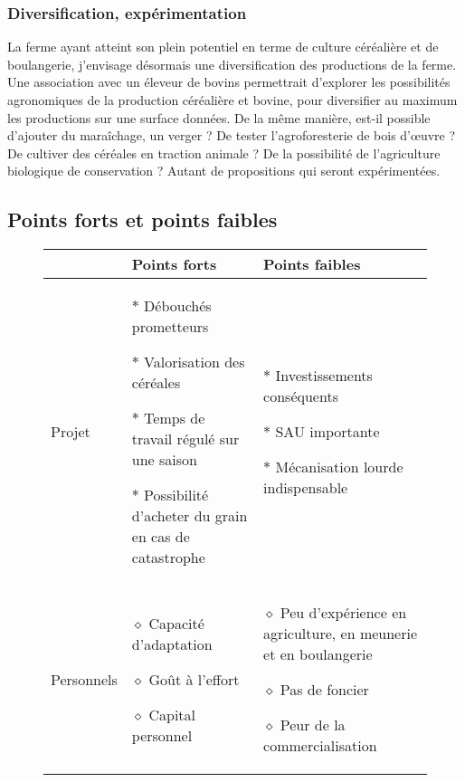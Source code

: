 \documentclass{article}
\begin{document}
\subsubsection*{Diversification, expérimentation}

La ferme ayant atteint son plein potentiel en terme de culture céréalière et de boulangerie, j'envisage désormais une diversification des productions de la ferme. Une association avec un éleveur de bovins permettrait d'explorer les possibilités agronomiques de la production céréalière et bovine, pour diversifier au maximum les productions sur une surface données. De la même manière, est-il possible d'ajouter du maraîchage, un verger ? De tester l'agroforesterie de bois d'œuvre ? De cultiver des céréales en traction animale ? De la possibilité de l'agriculture biologique de conservation ? Autant de propositions qui seront expérimentées.

\subsection{Points forts et points faibles}

\begin{figure}[h!]
\begin{center}
\begin{tabular}{|p{2cm}|p{5cm}|p{5cm}|}
\hline
 & Points forts & Points faibles \\
\hline
Projet & 
$\ast$ Débouchés prometteurs

$\ast$ Valorisation des céréales

$\ast$ Temps de travail régulé sur une saison

$\ast$ Possibilité d'acheter du grain en cas de catastrophe
  & 
$\ast$ Investissements conséquents

$\ast$ SAU importante

$\ast$ Mécanisation lourde indispensable
 \\
\hline
Personnels & 
$\diamond$ Capacité d'adaptation

$\diamond$ Goût à l'effort

$\diamond$ Capital personnel
& 
$\diamond$ Peu d'expérience en agriculture, en meunerie et en boulangerie

$\diamond$ Pas de foncier

$\diamond$ Peur de la commercialisation
\\
\hline
\end{tabular}
\end{center}
\label{sejour_semaine}
\end{figure}
\end{document}
